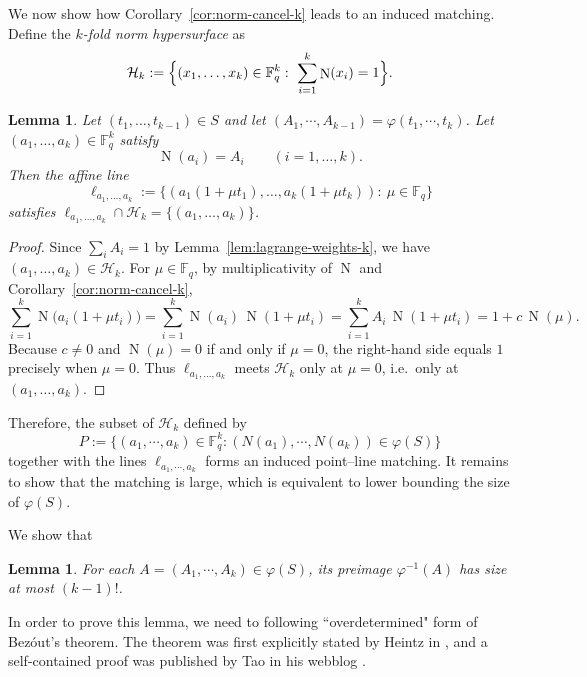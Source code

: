 \documentclass[12pt,reqno]{amsart}
\theoremstyle{plain}
\newtheorem{lemma}[theorem]{Lemma}
\theoremstyle{definition}
\newcommand{\F}{\mathbb{F}}
\newcommand{\1}{\mathbf{1}}
\DeclareMathOperator{\Norm}{N}
\begin{document}
\smallskip

We now show how Corollary~\ref{cor:norm-cancel-k} leads to an induced matching.
Define the \emph{$k$-fold norm hypersurface} as
\[
  \mathcal{H}_k:=\Bigl\{(x_1,\dots,x_k)\in\F_q^k:\ \sum_{i=1}^k \Norm(x_i)=1\Bigr\}.
\]

\begin{lemma}
\label{lem:unique-line-on-Hk}
Let $(t_1,\dots,t_{k - 1}) \in S$ and let $(A_1, \cdots, A_{k - 1}) = \varphi(t_1, \cdots, t_k)$. Let $(a_1,\dots,a_k)\in\F_q^k$ satisfy
\[
  \Norm(a_i)=A_i\qquad (i=1,\dots,k).
\]
Then the affine line
\[
  \ell_{a_1,\dots,a_k}:=\{(a_1(1+\mu t_1),\dots,a_k(1+\mu t_k)):\ \mu\in\F_q\}
\]
satisfies $\ell_{a_1,\dots,a_k}\cap \mathcal{H}_k=\{(a_1,\dots,a_k)\}$.
\end{lemma}

\begin{proof}
Since $\sum_i A_i=1$ by Lemma~\ref{lem:lagrange-weights-k}, we have $(a_1,\dots,a_k)\in\mathcal{H}_k$.
For $\mu\in\F_q$, by multiplicativity of $\Norm$ and Corollary~\ref{cor:norm-cancel-k},
\[
  \sum_{i=1}^k \Norm\bigl(a_i(1+\mu t_i)\bigr)
  = \sum_{i=1}^k \Norm(a_i)\,\Norm(1+\mu t_i)
  = \sum_{i=1}^k A_i\,\Norm(1+\mu t_i)
  = 1 + c\,\Norm(\mu).
\]
Because $c\neq 0$ and $\Norm(\mu)=0$ if and only if $\mu=0$, the right-hand side equals $1$ precisely when $\mu=0$.
Thus $\ell_{a_1,\dots,a_k}$ meets $\mathcal{H}_k$ only at $\mu=0$, i.e.\ only at $(a_1,\dots,a_k)$.
\end{proof}

Therefore, the subset of $\mathcal{H}_k$ defined by
\[
  P := \{(a_1, \cdots, a_k) \in \F_q^k: (N(a_1), \cdots, N(a_k)) \in \varphi(S)\}
\]
together with the lines $\ell_{a_1, \cdots, a_k}$ forms an induced point--line matching. It remains to show that the matching is large, which is equivalent to lower bounding the size of $\varphi(S)$. 

We show that 

\begin{lemma}
    \label{lem:preimage-size}
    For each $A = (A_1, \cdots, A_k) \in \varphi(S)$, its preimage $\varphi^{-1}(A)$ has size at most $(k - 1)!$.
\end{lemma}

In order to prove this lemma, we need to following ``overdetermined" form of Bez\'{o}ut's theorem. The theorem was first explicitly stated by Heintz in \cite{Heintz}, and a self-contained proof was published by Tao in his webblog \cite{Tao2011}.
\end{document}
